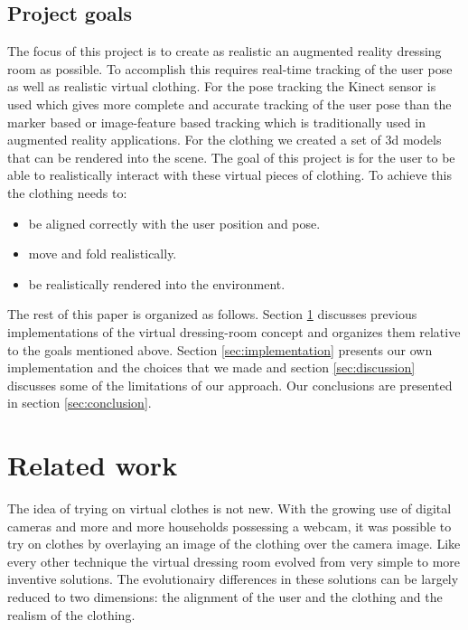 \documentclass[a4paper]{article}
\begin{document}

\subsection{Project goals}
\label{sec:project_goals}

The focus of this project is to create as realistic an augmented reality dressing room as possible. To accomplish this requires real-time tracking of the user pose as well as realistic virtual clothing. For the pose tracking the Kinect sensor is used which gives more complete and accurate tracking of the user pose than the marker based or image-feature based tracking which is traditionally used in augmented reality applications. For the clothing we created a set of 3d models that can be rendered into the scene. The goal of this project is for the user to be able to realistically interact with these virtual pieces of clothing. To achieve this the clothing needs to:
\begin{itemize}
\item be aligned correctly with the user position and pose.
\item move and fold realistically. 
\item be realistically rendered into the environment.
\end{itemize}

The rest of this paper is organized as follows. Section \ref{sec:related_work} discusses previous implementations of the virtual dressing-room concept and organizes them relative to the goals mentioned above. Section \ref{sec:implementation} presents our own implementation and the choices that we made and section \ref{sec:discussion} discusses some of the limitations of our approach. Our conclusions are presented in section \ref{sec:conclusion}.


\section{Related work}
\label{sec:related_work}

The idea of trying on virtual clothes is not new. With the growing use of digital cameras and more and more households possessing a webcam, it was possible to try on clothes by overlaying an image of the clothing over the camera image. Like every other technique the virtual dressing room evolved from very simple to more inventive solutions. The evolutionairy differences in these solutions can be largely reduced to two dimensions: the alignment of the user and the clothing and the realism of the clothing.
\end{document}
